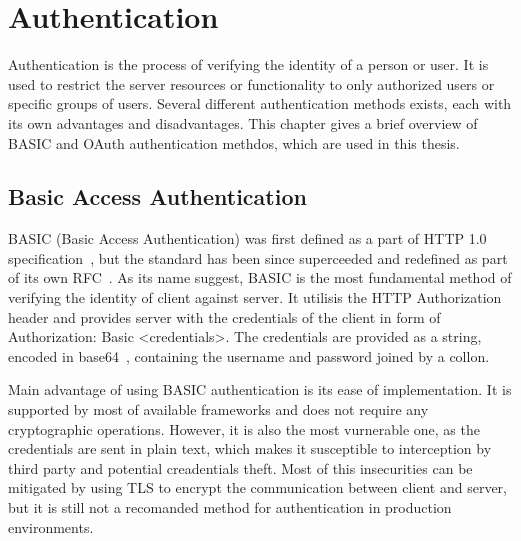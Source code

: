 
\chapter{Authentication}
\label{chapter:authentication}
Authentication is the process of verifying the identity of a person or user. It is used to restrict the server resources or functionality to only authorized users or specific groups of users. Several different authentication methods exists, each with its own advantages and disadvantages. This chapter gives a brief overview of BASIC and OAuth authentication methdos, which are used in this thesis.

\section{Basic Access Authentication}
BASIC (Basic Access Authentication) was first defined as a part of HTTP 1.0 specification \cite{http1.0_w3}, but the standard has been since superceeded and redefined as part of its own RFC \cite{basic_auth_rfc}. As its name suggest, BASIC is the most fundamental method of verifying the identity of client against server. It utilisis the HTTP Authorization header and provides server with the credentials of the client in form of Authorization: Basic <credentials>. The credentials are provided as a string, encoded in base64 \cite{base64_rfc}, containing the username and password joined by a collon.

Main advantage of using BASIC authentication is its ease of implementation. It is supported by most of available frameworks and does not require any cryptographic operations. However, it is also the most vurnerable one, as the credentials are sent in plain text, which makes it susceptible to interception by third party and potential creadentials theft. Most of this insecurities can be mitigated by using TLS to encrypt the communication between client and server, but it is still not a recomanded method for authentication in production environments.


